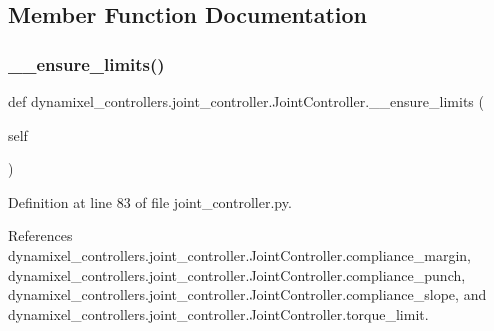 \subsection{Member Function Documentation}
\mbox{\label{classdynamixel__controllers_1_1joint__controller_1_1_joint_controller_aff8693c49d92c89f19a89a97fa029adb}} 
\subsubsection{\texorpdfstring{\+\_\+\+\_\+ensure\+\_\+limits()}{\_\_ensure\_limits()}}
{\footnotesize\ttfamily def dynamixel\+\_\+controllers.\+joint\+\_\+controller.\+Joint\+Controller.\+\_\+\+\_\+ensure\+\_\+limits (\begin{DoxyParamCaption}\item[{}]{self }\end{DoxyParamCaption})\hspace{0.3cm}{\ttfamily [private]}}



Definition at line 83 of file joint\+\_\+controller.\+py.



References dynamixel\+\_\+controllers.\+joint\+\_\+controller.\+Joint\+Controller.\+compliance\+\_\+margin, dynamixel\+\_\+controllers.\+joint\+\_\+controller.\+Joint\+Controller.\+compliance\+\_\+punch, dynamixel\+\_\+controllers.\+joint\+\_\+controller.\+Joint\+Controller.\+compliance\+\_\+slope, and dynamixel\+\_\+controllers.\+joint\+\_\+controller.\+Joint\+Controller.\+torque\+\_\+limit.


